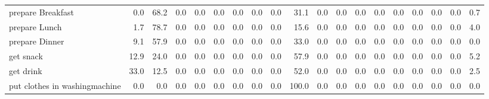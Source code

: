 \documentclass{article}
\begin{document}
\begin{sideways}
\begin{tabular}{lrrrrrrrrrrrrrrrrrr}
prepare Breakfast             &         0.0 &               68.2 &           0.0 &                          0.0 &                0.0 &                0.0 &                        0.0 &          0.0 &             31.1 &                0.0 &                    0.0 &                      0.0 &                  0.0 &                   0.0 &              0.0 &              0.0 &                                  0.0 &          0.7 \\
prepare Lunch                 &         1.7 &               78.7 &           0.0 &                          0.0 &                0.0 &                0.0 &                        0.0 &          0.0 &             15.6 &                0.0 &                    0.0 &                      0.0 &                  0.0 &                   0.0 &              0.0 &              0.0 &                                  0.0 &          4.0 \\
prepare Dinner                &         9.1 &               57.9 &           0.0 &                          0.0 &                0.0 &                0.0 &                        0.0 &          0.0 &             33.0 &                0.0 &                    0.0 &                      0.0 &                  0.0 &                   0.0 &              0.0 &              0.0 &                                  0.0 &          0.0 \\
get snack                     &        12.9 &               24.0 &           0.0 &                          0.0 &                0.0 &                0.0 &                        0.0 &          0.0 &             57.9 &                0.0 &                    0.0 &                      0.0 &                  0.0 &                   0.0 &              0.0 &              0.0 &                                  0.0 &          5.2 \\
get drink                     &        33.0 &               12.5 &           0.0 &                          0.0 &                0.0 &                0.0 &                        0.0 &          0.0 &             52.0 &                0.0 &                    0.0 &                      0.0 &                  0.0 &                   0.0 &              0.0 &              0.0 &                                  0.0 &          2.5 \\
put clothes in washingmachine &         0.0 &                0.0 &           0.0 &                          0.0 &                0.0 &                0.0 &                        0.0 &          0.0 &            100.0 &                0.0 &                    0.0 &                      0.0 &                  0.0 &                   0.0 &              0.0 &              0.0 &                                  0.0 &          0.0 \\

\end{tabular}
\end{sideways}
\end{document}
